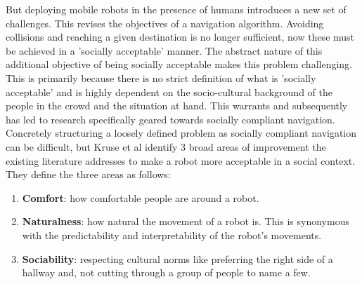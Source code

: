 But deploying mobile robots in the presence of humans introduces a new set of challenges. This revises the objectives of a navigation algorithm. Avoiding collisions and reaching a given destination is no longer sufficient, now these must be achieved in a 'socially acceptable' manner. The abstract nature of this additional objective of being socially acceptable makes this problem challenging. This is primarily because there is no strict definition of what is 'socially acceptable' and is highly dependent on the socio-cultural background of the people in the crowd and the situation at hand. This warrants and subsequently has led to research specifically geared towards socially compliant navigation.\\

Concretely structuring a loosely defined problem as socially compliant navigation can be difficult, but Kruse et al identify 3 broad areas of improvement the existing literature addresses to make a robot more acceptable in a social context. They define the three areas as follows:

\begin{enumerate}
    \item \textbf{Comfort}: how comfortable people are around a robot. 
    \item \textbf{Naturalness}: how natural the movement of a robot is. This is synonymous with the predictability and interpretability of the robot's movements.
    \item \textbf{Sociability}: respecting cultural norms like preferring the right side of a hallway and, not cutting through a group of people to name a few. %
\end{enumerate}


